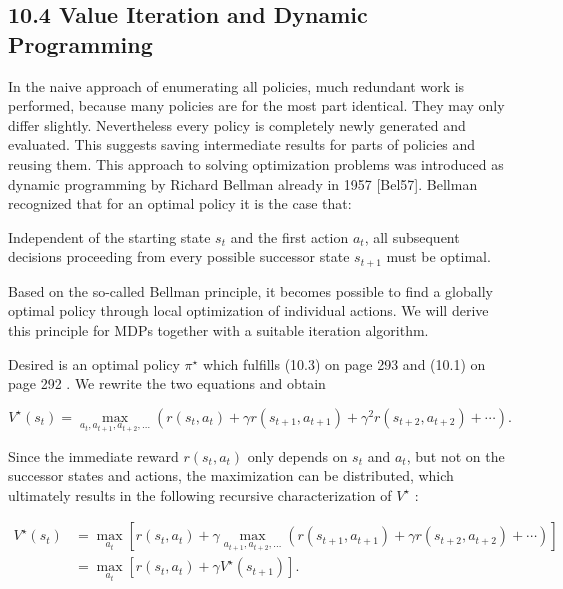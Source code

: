 \documentclass[10pt]{book}
\begin{document}
\begin{center}
\begin{enumerate}
\begin{center}
\begin{center}
\begin{center}
\begin{center}
\subsection*{10.4 Value Iteration and Dynamic Programming}
In the naive approach of enumerating all policies, much redundant work is performed, because many policies are for the most part identical. They may only differ slightly. Nevertheless every policy is completely newly generated and evaluated. This suggests saving intermediate results for parts of policies and reusing them. This approach to solving optimization problems was introduced as dynamic programming by Richard Bellman already in 1957 [Bel57]. Bellman recognized that for an optimal policy it is the case that:

Independent of the starting state $s_{t}$ and the first action $a_{t}$, all subsequent decisions proceeding from every possible successor state $s_{t+1}$ must be optimal.

Based on the so-called Bellman principle, it becomes possible to find a globally optimal policy through local optimization of individual actions. We will derive this principle for MDPs together with a suitable iteration algorithm.

Desired is an optimal policy $\pi^{\star}$ which fulfills (10.3) on page 293 and (10.1) on page 292 . We rewrite the two equations and obtain


\begin{equation*}
V^{\star}\left(s_{t}\right)=\max _{a_{t}, a_{t+1}, a_{t+2}, \ldots}\left(r\left(s_{t}, a_{t}\right)+\gamma r\left(s_{t+1}, a_{t+1}\right)+\gamma^{2} r\left(s_{t+2}, a_{t+2}\right)+\cdots\right) . \tag{10.4}
\end{equation*}


Since the immediate reward $r\left(s_{t}, a_{t}\right)$ only depends on $s_{t}$ and $a_{t}$, but not on the successor states and actions, the maximization can be distributed, which ultimately results in the following recursive characterization of $V^{\star}$ :


\begin{align*}
V^{\star}\left(s_{t}\right) & =\max _{a_{t}}\left[r\left(s_{t}, a_{t}\right)+\gamma \max _{a_{t+1}, a_{t+2}, \ldots}\left(r\left(s_{t+1}, a_{t+1}\right)+\gamma r\left(s_{t+2}, a_{t+2}\right)+\cdots\right)\right] \\
& =\max _{a_{t}}\left[r\left(s_{t}, a_{t}\right)+\gamma V^{\star}\left(s_{t+1}\right)\right] . \tag{10.5}
\end{align*}



\end{center}
\end{center}
\end{center}
\end{center}
\end{enumerate}
\end{center}
\end{document}
